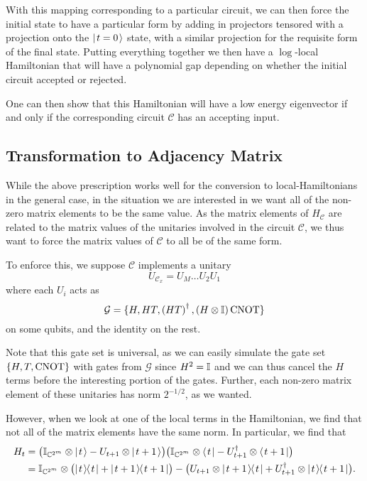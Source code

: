 \documentclass[../thesis-main/thesis-main]{subfiles}
\begin{document}
With this mapping corresponding to a particular circuit, we can then force the initial state to have a particular form by adding in projectors tensored with a projection onto the $|\mspace{2mu} t=0 \mspace{2mu} \rangle$ state, with a similar projection for the requisite form of the final state.  Putting everything together we then have a $\log$-local Hamiltonian that will have a polynomial gap depending on whether the initial circuit accepted or rejected.

One can then show that this Hamiltonian will have a low energy eigenvector if and only if the corresponding circuit $\mathcal{C}$ has an accepting input.

\subsection{Transformation to Adjacency Matrix}

While the above prescription works well for the conversion to local-Hamiltonians in the general case, in the situation we are interested in we want all of the non-zero matrix elements to be the same value.  As the matrix elements of $H_\mathcal{C}$ are related to the matrix values of the unitaries involved in the circuit $\mathcal{C}$, we thus want to force the matrix values of $\mathcal{C}$ to all be of the same form.

To enforce this, we suppose $\mathcal{C}$ implements a unitary 
\begin{equation}
U_{\mathcal{C}_{x}}=U_{M}\ldots U_{2}U_{1}\label{eq:single_qubit_circuit}
\end{equation}
 where each $U_{i}$ acts as
\begin{equation}
\mathcal{G}=\{H,HT,\left(HT\right)^{\dagger},\left(H\otimes\mathbb{I}\right)\mathrm{CNOT}\}
\end{equation}
on some qubits, and the identity on the rest.

Note that this gate set is universal, as we can easily simulate the gate set $\{H, T, \mathrm{CNOT}\}$ with gates from $\mathcal{G}$ since $H^2 = \mathbb{I}$ and we can thus cancel the $H$ terms before the interesting portion of the gates.  Further, each non-zero matrix element of these unitaries has norm $2^{-1/2}$, as we wanted.

However, when we look at one of the local terms in the Hamiltonian, we find that not all of the matrix elements have the same norm.  In particular, we find that
\begin{align}
  H_t &= \big(\mathbb{I}_{\mathbb{C}^{2^m}} \otimes |\mspace{2mu} t \mspace{2mu} \rangle - U_{t+1}\otimes|\mspace{2mu} t+1 \mspace{2mu} \rangle \big) \big(\mathbb{I}_{\mathbb{C}^{2^m}} \otimes \langle\mspace{2mu} t \mspace{2mu} | - U_{t+1}^\dag \otimes \langle\mspace{2mu} t+1 \mspace{2mu} |\big)\\
         &= \mathbb{I}_{\mathbb{C}^{2^m}} \otimes \big(|\mspace{2mu} t \mspace{2mu} \rangle\mspace{-2mu}\langle\mspace{2mu} t \mspace{2mu} | + |\mspace{2mu} t+1 \mspace{2mu} \rangle\mspace{-2mu}\langle\mspace{2mu} t+1 \mspace{2mu} |\big) - \big( U_{t+1} \otimes |\mspace{2mu} t+1 \mspace{2mu} \rangle\mspace{-2mu}\langle\mspace{2mu} t \mspace{2mu} | + U_{t+1}^\dag \otimes |\mspace{2mu} t \mspace{2mu} \rangle\mspace{-2mu}\langle\mspace{2mu} t+1 \mspace{2mu} |\big). \label{eq:circuit_to_Hamiltonian_term}
\end{align}
\end{document}
